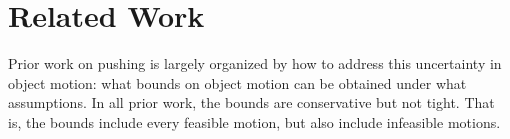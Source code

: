 \documentclass[conference]{IEEEtran}
\begin{document}





\section{Related Work}\label{sec:related-work}


Prior work on pushing is largely organized by how to address this
uncertainty in object motion: what bounds on object motion can be
obtained under what assumptions.  In all prior work, the bounds are
conservative but not tight.  That is, the bounds include every
feasible motion, but also include infeasible motions.
\end{document}

